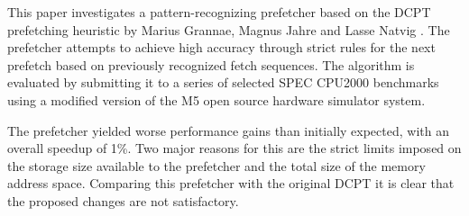 This paper investigates a pattern-recognizing prefetcher based on the DCPT prefetching heuristic by Marius Grannae, Magnus Jahre and Lasse Natvig \cite{reference:jahre}. The prefetcher attempts to achieve high accuracy through strict rules for the next prefetch based on previously recognized fetch sequences.
The algorithm is evaluated by submitting it to a series of selected SPEC CPU2000 benchmarks using a modified version of the M5 open source hardware simulator system.

The prefetcher yielded worse performance gains than initially expected, with an overall speedup of 1\%. Two major reasons for this are the strict limits imposed on the storage size available to the prefetcher and the total size of the memory address space. Comparing this prefetcher with the original DCPT it is clear that the proposed changes are not satisfactory.
